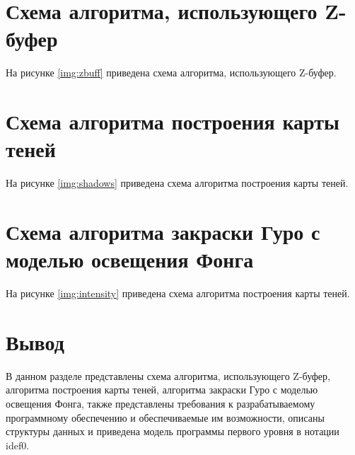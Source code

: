 
\section{Схема алгоритма, использующего \newline Z-буфер}

На рисунке \ref{img:zbuff} приведена схема алгоритма, использующего Z-буфер.


\pagebreak

\section{Схема алгоритма построения карты теней}

На рисунке \ref{img:shadows} приведена схема алгоритма построения карты теней.


\pagebreak

\section{Схема алгоритма закраски Гуро с моделью освещения Фонга}

На рисунке \ref{img:intensity} приведена схема алгоритма построения карты теней.


\pagebreak

\section*{Вывод}

В данном разделе представлены схема алгоритма, использующего Z-буфер, алгоритма построения карты теней, алгоритма закраски Гуро с моделью освещения Фонга, также представлены требования к разрабатываемому программному обеспечению и обеспечиваемые им возможности, описаны структуры данных и приведена модель программы первого уровня в нотации idef0.
